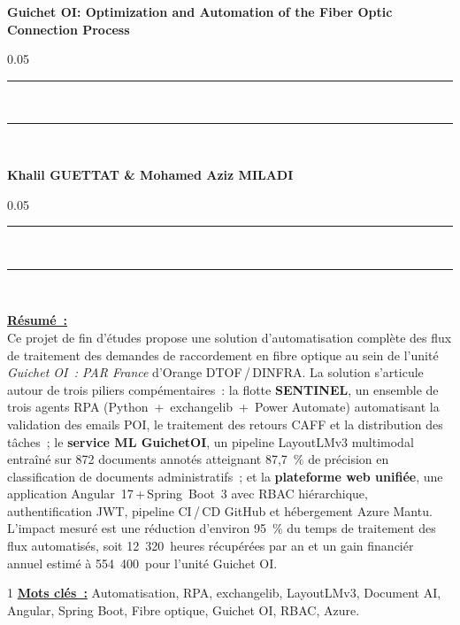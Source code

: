 \newpage
\thispagestyle{empty}
\begin{center}
  \renewcommand*{\familydefault}{\defaultFont}
  \fontsize{12pt}{12pt}\selectfont%
  \textbf{
  Guichet OI: Optimization and Automation of the Fiber Optic Connection Process\\%
  }
\vspace{15pt} {%
  \begin{spacing}{0.05}
    \rule{200pt}{2pt}\\
    \rule{200pt}{0.75pt}\\
  \end{spacing}
  \renewcommand*{\familydefault}{\defaultFont}
  \fontsize{14pt}{14pt}\selectfont%
  \vspace{15pt}
  \textbf{Khalil GUETTAT \& Mohamed Aziz MILADI}
  \vspace{8pt}
  \begin{spacing}{0.05}
    \rule{200pt}{0.75pt}\\
    \rule{200pt}{2pt}\\
  \end{spacing}
}
\end{center}

\fontsize{12pt}{12pt}\selectfont%
\underline{\textbf{R\'esum\'e~:}}\\
Ce projet de fin d'\'etudes propose une solution d'automatisation compl\`ete des
flux de traitement des demandes de raccordement en fibre optique au sein de l'unit\'e
\textit{Guichet OI~: PAR France} d'Orange DTOF\,/\,DINFRA. La solution s'articule
autour de trois piliers comp\'ementaires~: la flotte \textbf{SENTINEL}, un ensemble
de trois agents RPA (Python~+~exchangelib~+~Power Automate) automatisant la validation
des emails POI, le traitement des retours CAFF et la distribution des t\^aches~;
le \textbf{service ML GuichetOI}, un pipeline LayoutLMv3 multimodal entra\^in\'e
sur 872 documents annot\'es atteignant 87,7~\% de pr\'ecision en classification de
documents administratifs~; et la \textbf{plateforme web unifi\'ee}, une application
Angular~17\,+\,Spring~Boot~3 avec RBAC hi\'erarchique, authentification JWT, pipeline
CI\,/\,CD GitHub et h\'ebergement Azure Mantu. L'impact mesur\'e est une r\'eduction
d'environ 95~\% du temps de traitement des flux automatis\'es, soit 12~320~heures
r\'ecup\'er\'ees par an et un gain financi\'er annuel estim\'e
\`a 554~400\,\texteuro{} pour l'unit\'e Guichet OI.

\begin{spacing}{1}
\underline{\textbf{Mots cl\'es~:}} Automatisation, RPA, exchangelib, LayoutLMv3, Document AI,
Angular, Spring Boot, Fibre optique, Guichet OI, RBAC, Azure.\\
\end{spacing}

